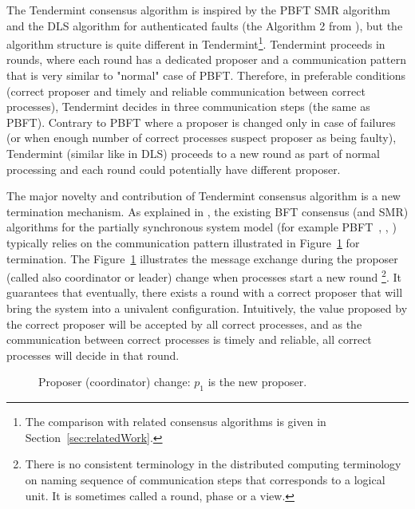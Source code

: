 The Tendermint consensus algorithm is inspired by the PBFT SMR algorithm~\cite{CL99:osdi} and the DLS algorithm for authenticated faults (the Algorithm 2 from \cite{DLS88:jacm}), but the algorithm structure is quite different in Tendermint\footnote{The comparison with related consensus algorithms is given in Section~\ref{sec:relatedWork}.}. Tendermint proceeds in rounds, where each round has a dedicated proposer and a communication pattern that is very similar to "normal" case of PBFT. Therefore, in preferable conditions (correct proposer and timely and reliable communication between correct processes), Tendermint decides in three communication steps (the same as PBFT). Contrary to PBFT where a proposer is changed only in case of failures (or when enough number of correct processes suspect proposer as being faulty), Tendermint (similar like in DLS) proceeds to a new round as part of normal processing and each round could potentially have different proposer. 

The major novelty and contribution of Tendermint consensus algorithm is a new termination mechanism. As explained in \cite{MHS09:opodis, RMS10:dsn}, the existing BFT consensus (and SMR) algorithms for the partially synchronous system model (for example PBFT~\cite{CL99:osdi}, \cite{DLS88:jacm}, \cite{MA06:tdsc}) typically relies on the communication pattern illustrated in Figure~\ref{ch3:fig:coordinator-change} for termination. The Figure~\ref{ch3:fig:coordinator-change} illustrates the message exchange during the proposer (called also coordinator or leader) change when processes start a new round \footnote{There is no consistent terminology in the distributed computing terminology on naming sequence of communication steps that corresponds to a logical unit. It is sometimes called a round, phase or a view.}. It guarantees that eventually, there exists a round with a correct proposer that will bring the system into a univalent configuration. Intuitively, the value proposed by the correct proposer will be accepted by all correct processes, and as the communication between correct processes is timely and reliable, all correct processes will decide in that round.   

\begin{figure}[tbh!]
	\def\rdstretch{5}
	\def\ystretch{3}
	\centering
	\begin{rounddiag}{4}{2}
	\end{rounddiag}
	\vspace{-5mm}
	\caption{\boldmath Proposer (coordinator) change: $p_1$ is the new proposer.}
	\label{ch3:fig:coordinator-change}
\end{figure}  

